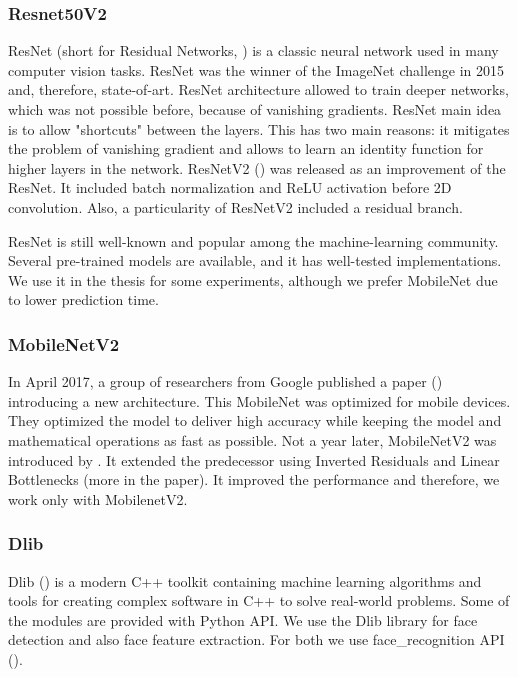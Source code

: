 \subsubsection*{Resnet50V2}

ResNet (short for Residual Networks, \cite{resnet}) is a classic neural network used in many computer vision tasks. ResNet was the winner of the ImageNet challenge in 2015 and, therefore, state-of-art. ResNet architecture allowed to train deeper networks, which was not possible before, because of vanishing gradients. ResNet main idea is to allow "shortcuts" between the layers. This has two main reasons: it mitigates the problem of vanishing gradient and allows to learn an identity function for higher layers in the network. ResNetV2 (\cite{resnetv2}) was released as an improvement of the ResNet. It included batch normalization and ReLU activation before 2D convolution. Also, a particularity of ResNetV2 included a residual branch.

ResNet is still well-known and popular among the machine-learning community. Several pre-trained models are available, and it has well-tested implementations. We use it in the thesis for some experiments, although we prefer MobileNet due to lower prediction time.

\subsubsection*{MobileNetV2}

In April 2017, a group of researchers from Google published a paper (\cite{mobilenet}) introducing a new architecture. This MobileNet was optimized for mobile devices. They optimized the model to deliver high accuracy while keeping the model and mathematical operations as fast as possible. Not a year later, MobileNetV2 was introduced by \cite{mobilenetv2}. It extended the predecessor using Inverted Residuals and Linear Bottlenecks (more in the paper). It improved the performance and therefore, we work only with MobilenetV2.


\subsubsection{Dlib}
Dlib (\cite{king2009dlib}) is a modern C++ toolkit containing machine learning algorithms and tools for creating complex software in C++ to solve real-world problems. Some of the modules are provided with Python API. We use the Dlib library for face detection and also face feature extraction. For both we use face\_recognition API (\cite{geitgey2016machine}). 


